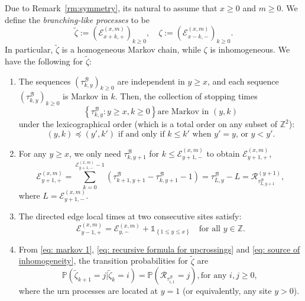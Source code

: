 \documentclass[EJP]{ejpecp} %
\begin{document}
Due to Remark~\ref{rm:symmetry}, its natural to assume that $x\ge 0$ and $m \ge 0$. We define the \textit{branching-like processes} to be
\[
\tilde{\zeta} := \left(\mathcal{E}^{(x,m)}_{x+k,+} \right)_{k\geq 0}, \quad
\zeta := \left(\mathcal{E}^{(x,m)}_{x-k,-} \right)_{k\geq 0}
.\]
In particular, $\tilde{\zeta}$ is a homogeneous Markov chain, while $\zeta$ is inhomogeneous. We have the following for $\tilde{\zeta}$:
\begin{enumerate}
	\item The sequences $(\tau^{\mathscr{B}}_{k,y})_{k\geq 0} $ are independent in $y \geq x$, and each sequence $\left(\tau^{\mathscr{B}}_{k,y}\right)_{k\geq 0} $ is Markov in $k$. Then, the collection of stopping times
	\begin{equation}\label{eq: markov 1} 
		\left\{\tau^{\mathscr{B}}_{k,y}: y\geq x, k\geq 0 \right\} \mbox{are Markov in $(y,k)$}
	\end{equation}
	under the lexicographical order (which is a total order on any subset of $\mathbb{Z}^2$): 
	\begin{equation*}\label{eq: lexicographical order}
		(y,k) \preceq (y',k')  \mbox{ if and only if }
		k \leq k'   \mbox{ when $y' = y$, or } 
		y <y'. 
	\end{equation*} 
	
	\item For any $y\geq x$, we only need $\tau^{\mathscr{B}}_{k,y+1}$ for $k\leq \mathcal{E}^{(x,m)}_{y+1,-}$ to obtain $\mathcal{E}^{(x,m)}_{y+1,+}$,
	\begin{equation} \label{eq: recursive formula for upcrossings}
		\mathcal{E}_{y+1,+}^{(x,m)}	=  \sum_{k= 0 }^{\mathcal{E}_{y+1,-}^{(x,m)}-1}	\left(\tau^{\mathscr{B}}_{k+1,y+1}-\tau^{\mathscr{B}}_{k,y+1}-1 \right) = \tau^{\mathscr{B}}_{ L,y } - L = \mathscr{R}^{(y + 1)}_{\tau^{\mathscr{B}}_{ L,y+1 }},
	\end{equation}
	where $L = \mathcal{E}_{y+1,-}^{(x,m)}$.
	
	\item The directed edge local times at two consecutive sites satisfy:
	\begin{equation}\label{eq: source of inhomogeneity}
		\mathcal{E}_{y-1,+}^{(x,m)} = \mathcal{E}_{y,-}^{(x,m)} + \mathbb{1}_{ \left\{ 1\leq y \leq x \right\} }
		\quad \text{for all }y\in \mathbb{Z}.
	\end{equation}
	
	\item  From \eqref{eq: markov 1}, \eqref{eq: recursive formula for upcrossings} and \eqref{eq: source of inhomogeneity}, the transition probabilities for $\tilde{\zeta}$ are 
	\begin{equation}\label{eq: transition prob on positive}
		\mathbb{P}\left(\tilde{\zeta}_{k+1}=j \vert \tilde{\zeta}_k =i  \right) = 
		\mathbb{P}\left( \mathscr{R}_{\tau_{i,1}^{\mathscr{B}}} = j \right), \mbox{for any $i,j\geq 0$, } 
	\end{equation} 
	where the urn processes are located at $y = 1$ (or equivalently, any site $y>0$).
\end{enumerate}
\end{document}
